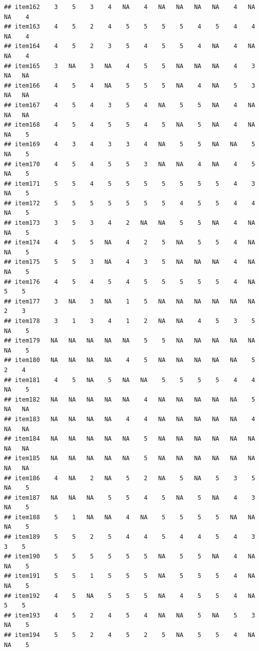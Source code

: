 \documentclass[
  man]{apa6}
\begin{document}
\begin{verbatim}
## item162    3    5    3    4   NA    4   NA   NA   NA   NA    4   NA   NA    4
## item163    4    5    2    4    5    5    5    5    4    5    4    4   NA    4
## item164    4    5    2    3    5    4    5    5    4   NA    4   NA   NA    4
## item165    3   NA    3   NA    4    5    5   NA   NA   NA    4    3   NA   NA
## item166    4    5    4   NA    5    5    5   NA    4   NA    5    3   NA   NA
## item167    4    5    4    3    5    4   NA    5    5   NA    4   NA   NA   NA
## item168    4    5    4    5    5    4    5   NA    5   NA    4   NA   NA    5
## item169    4    3    4    3    3    4   NA    5    5   NA   NA    5   NA    5
## item170    4    5    4    5    5    3   NA   NA    4   NA    4    5   NA    5
## item171    5    5    4    5    5    5    5    5    5    5    4    3   NA    5
## item172    5    5    5    5    5    5    5    4    5    5    4    4   NA    5
## item173    3    5    3    4    2   NA   NA    5    5   NA    4   NA   NA    5
## item174    4    5    5   NA    4    2    5   NA    5    5    4   NA   NA    5
## item175    5    5    3   NA    4    3    5   NA   NA   NA    4   NA   NA    5
## item176    4    5    4    5    4    5    5    5    5    5    4   NA    5    5
## item177    3   NA    3   NA    1    5   NA   NA   NA   NA   NA   NA    2    3
## item178    3    1    3    4    1    2   NA   NA    4    5    3    5   NA    5
## item179   NA   NA   NA   NA   NA    5    5   NA   NA   NA   NA   NA   NA    5
## item180   NA   NA   NA   NA    4    5   NA   NA   NA   NA   NA    5    2    4
## item181    4    5   NA    5   NA   NA    5    5    5    5    4    4   NA    5
## item182   NA   NA   NA   NA   NA    4   NA   NA   NA   NA   NA    5   NA   NA
## item183   NA   NA   NA   NA    4    4   NA   NA   NA   NA   NA    4   NA   NA
## item184   NA   NA   NA   NA   NA    5   NA   NA   NA   NA   NA   NA   NA   NA
## item185   NA   NA   NA   NA   NA    5   NA   NA   NA   NA   NA   NA   NA   NA
## item186    4   NA    2   NA    5    2   NA    5   NA    5    3    5   NA    5
## item187   NA   NA   NA    5    5    4    5   NA    5   NA    4    3   NA    5
## item188    5    1   NA   NA    4   NA    5    5    5    5   NA   NA   NA    5
## item189    5    5    2    5    4    4    5    4    4    5    4    3    3    5
## item190    5    5    5    5    5    5   NA    5    5   NA    4   NA   NA    5
## item191    5    5    1    5    5    5   NA    5    5    5    4   NA   NA    5
## item192    4    5   NA    5    5    5   NA    4    5    5    4   NA    5    5
## item193    4    5    2    4    5    4   NA   NA    5   NA    5    3   NA    5
## item194    5    5    2    4    5    2    5   NA    5    5    4   NA   NA    5

\end{verbatim}
\end{document}
